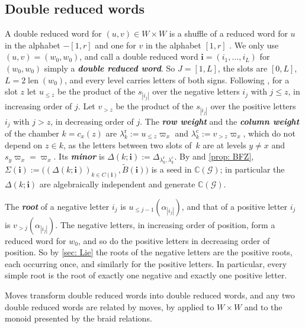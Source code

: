 \documentclass[a4paper]{amsart}
\numberwithin{equation}{section}
\theoremstyle{definition}
\theoremstyle{remark}
\newcommand{\bbC}{\mathbb{C}}
\newcommand{\mcG}{\mathcal{G}}
\newcommand{\bfi}{\mathbf{i}}
\newcommand{\tB}{\widetilde{B}}
\newcommand{\rr}{\mathrm{r}}
\newcommand{\cc}{\mathrm{c}}
\newcommand{\len}{\operatorname{len}}
\newcommand{\newword}[1]{\textbf{\emph{#1}}}
\begin{document}
\subsection{Double reduced words}
\label{sec: double words}
A double reduced word for $(u,v)\in W\times W$ is a shuffle of a reduced word for $u$ in the alphabet $-[1,r]$ and one for $v$ in the alphabet $[1,r]$ \cite[Section~2.2]{BFZ05}.
We only use~$(u,v)=(w_0,w_0)$, and call a double reduced word $\bfi=(i_1,\dots,i_L)$ for $(w_0,w_0)$ simply a \newword{double reduced word}.
So $J=[1,L]$, the slots are $[0,L]$, $L=2\len(w_0)$, and every level carries letters of both signs.
Following \cite[(2.9)--(2.11)]{BFZ05}, for a slot $z$ let $u_{\le z}$ be the product of the $s_{|i_j|}$ over the negative letters $i_j$ with $j\le z$, in increasing order of $j$.
Let $v_{>z}$ be the product of the $s_{|i_j|}$ over the positive letters $i_j$ with $j>z$, in decreasing order of $j$.
The \newword{row weight} and the \newword{column weight} of the chamber $k=c_x(z)$ are $\lambda^\rr_k:=u_{\le z}\varpi_x$ and $\lambda^\cc_k:=v_{>z}\varpi_x$, which do not depend on $z\in k$, as the letters between two slots of~$k$ are at levels $y\neq x$ and $s_y\varpi_x=\varpi_x$.
Its \newword{minor} is $\Delta(k;\bfi):=\Delta_{\lambda^\rr_k,\lambda^\cc_k}$.
By \cite[Theorem~2.10]{BFZ05} and \cref{prop: BFZ}, $\Sigma(\bfi):=\big((\Delta(k;\bfi))_{k\in C(\bfi)},\tB(\bfi)\big)$ is a seed in $\bbC(\mcG)$; in particular the $\Delta(k;\bfi)$ are algebraically independent and generate $\bbC(\mcG)$.

The \newword{root} of a negative letter $i_j$ is $u_{\le j-1}(\alpha_{|i_j|})$, and that of a positive letter $i_j$ is $v_{>j}(\alpha_{|i_j|})$.
The negative letters, in increasing order of position, form a reduced word for $w_0$, and so do the positive letters in decreasing order of position.
So by \cref{sec: Lie} the roots of the negative letters are the positive roots, each occurring once, and similarly for the positive letters.
In particular, every simple root is the root of exactly one negative and exactly one positive letter.

Moves transform double reduced words into double reduced words, and any two double reduced words are related by moves, by \cite[Chapter~IV, Section~1.5, Proposition~5]{Bou02} applied to $W\times W$ and to the monoid presented by the braid relations.
\end{document}
